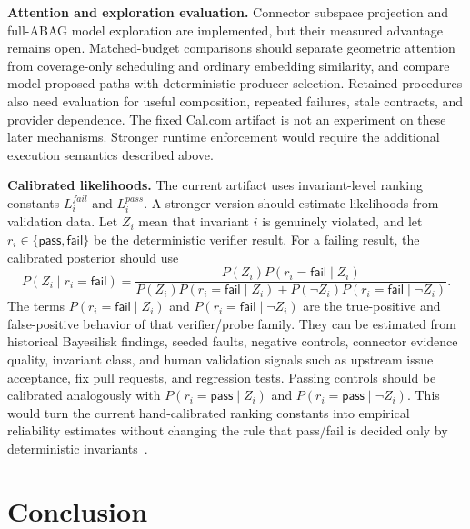 \documentclass[10pt]{article}
\newcommand{\Pass}{\mathsf{pass}}
\newcommand{\Fail}{\mathsf{fail}}
\begin{document}
\textbf{Attention and exploration evaluation.} Connector subspace projection
and full-ABAG model exploration are implemented, but their measured advantage
remains open. Matched-budget comparisons should separate geometric attention
from coverage-only scheduling and ordinary embedding similarity, and compare
model-proposed paths with deterministic producer selection. Retained procedures
also need evaluation for useful composition, repeated failures, stale contracts,
and provider dependence. The fixed Cal.com artifact is not an experiment
on these later mechanisms. Stronger runtime enforcement would require the
additional execution semantics described above.

\textbf{Calibrated likelihoods.} The current artifact uses invariant-level
ranking constants \(L_i^{fail}\) and \(L_i^{pass}\). A stronger version should
estimate likelihoods from validation data. Let \(Z_i\) mean that invariant
\(i\) is genuinely violated, and let \(r_i\in\{\Pass,\Fail\}\) be the
deterministic verifier result. For a failing result, the calibrated posterior
should use
\[
  P(Z_i\mid r_i=\Fail)=
  \frac{P(Z_i)P(r_i=\Fail\mid Z_i)}
       {P(Z_i)P(r_i=\Fail\mid Z_i)+
        P(\neg Z_i)P(r_i=\Fail\mid \neg Z_i)}.
\]
The terms \(P(r_i=\Fail\mid Z_i)\) and
\(P(r_i=\Fail\mid \neg Z_i)\) are the true-positive and false-positive behavior
of that verifier/probe family. They can be estimated from historical
Bayesilisk findings, seeded faults, negative controls, connector evidence
quality, invariant class, and human validation signals such as upstream issue
acceptance, fix pull requests, and regression tests. Passing controls should be
calibrated analogously with \(P(r_i=\Pass\mid Z_i)\) and
\(P(r_i=\Pass\mid \neg Z_i)\). This would turn the current hand-calibrated
ranking constants into empirical reliability estimates without changing the
rule that pass/fail is decided only by deterministic invariants~\cite{bishop2006pattern,guo2017calibration}.

\section{Conclusion}
\end{document}
